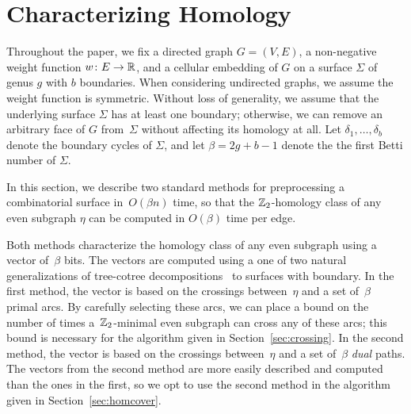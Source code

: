 \section{Characterizing Homology}
\label{sec:characterizing}


Throughout the paper, we fix a directed graph $G=(V,E)$, a non-negative weight function $w\colon E\to \mathbb{R}$, and a cellular embedding of $G$ on a surface $\Sigma$ of genus $g$ with $b$ boundaries.
When considering undirected graphs, we assume the weight function is symmetric.
Without loss of generality, we assume that the underlying surface $\Sigma$ has at least one boundary; otherwise, we can remove an arbitrary face of $G$ from~$\Sigma$ without affecting its homology at all.  Let $\delta_1, \dots, \delta_b$ denote the boundary cycles of $\Sigma$, and let $\beta = 2g+b-1$ denote the the first Betti number of $\Sigma$.


In this section, we describe two standard methods for preprocessing a combinatorial surface in~$O(\beta n)$ time, so that the $\mathbb{Z}_2$-homology class of any even subgraph $\eta$ can be computed in $O(\beta)$ time per edge.


Both methods characterize the homology class of any even subgraph using a vector of~$\beta$ bits.
The vectors are computed using a one of two natural generalizations of tree-cotree decompositions~\cite{e-dgteg-03} to surfaces with boundary.
In the first method, the vector is based on the crossings between~$\eta$ and a set of~$\beta$ primal arcs.
By carefully selecting these arcs, we can place a bound on the number of times a~$\mathbb{Z}_2$-minimal even subgraph can cross any of these arcs; this bound is necessary for the algorithm given in Section~\ref{sec:crossing}.
In the second method, the vector is based on the crossings between~$\eta$ and a set of~$\beta$ \emph{dual} paths.
The vectors from the second method are more easily described and computed than the ones in the first, so we opt to use the second method in the algorithm given in Section~\ref{sec:homcover}.



